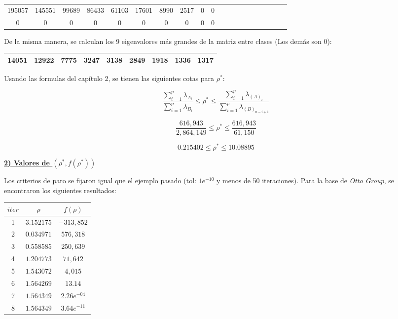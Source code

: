 \begin{center}
\begin{tabular}{ | c | c|  c |c | c|  c |c | c|  c |c | c | c|  c |c | c|  c |c | c|  c |c |} 
\hline
195057 & 145551 & 99689 & 86433 & 61103 & 17601 & 8990 & 2517 & 0 & 0 \\
0 & 0 & 0 & 0 & 0 & 0 & 0 & 0 & 0 & 0 \\
\hline
\hline
\end{tabular}
\end{center}

De la misma manera, se calculan los 9 eigenvalores más grandes de la matriz entre clases (Los demás son 0):

\begin{center}
\begin{tabular}{ | c | c|  c |c | c|  c |c | c|  c |} 
\hline
14051 & 12922 & 7775 & 3247 & 3138 & 2849 & 1918 & 1336 & 1317 \\
\hline
\hline
\end{tabular}
\end{center}

Usando las formulas del capítulo 2, se tienen las siguientes cotas para $\rho^*$:

\begin{equation*}
\frac{\sum_{i = 1}^{p}\lambda_{A_i}}{\sum_{i = 1}^{p}\lambda_{B_i}} \leq \rho^* \leq \frac{\sum_{i = 1}^{p}\lambda_{(A)_i}}{\sum_{i = 1}^{p}\lambda_{(B)_{n-i+1}}}  
\end{equation*}

\begin{equation*}
\frac{616,943}{2,864,149} \leq \rho^* \leq \frac{616,943}{61,150}
\end{equation*}

\begin{equation*}
0.215402 \leq \rho^* \leq 10.08895
\end{equation*}


\pagebreak

\underline{\textbf{2) Valores de $(\rho^*, f(\rho^*))$}}

Los criterios de paro se fijaron igual que el ejemplo pasado (tol: $1e^{-10}$ y menos de 50 iteraciones). Para la base de \textit{Otto Group}, se encontraron los siguientes resultados:

\begin{center}
\begin{tabular}{ | c | c|  c |} 
\hline
$iter$ & $\rho$ & $f(\rho)$  \\ 
\hline
\hline
1 & $3.152175$ & $-313,852$  \\ 
\hline
2 & $0.034971$ & $576,318$  \\ 
\hline
3 & $0.558585$ & $250,639$  \\ 
\hline
4 & $1.204773$ & $71,642$  \\ 
\hline
5 & $1.543072$ & $4,015$  \\ 
\hline
6 & $1.564269$ & $13.14$  \\ 
\hline
7 & $1.564349$ & $2.26 e^{-04}$  \\ 
\hline
8 & $1.564349$ & $3.64 e^{-11}$  \\ 
\hline
\hline
\end{tabular}
\end{center}

